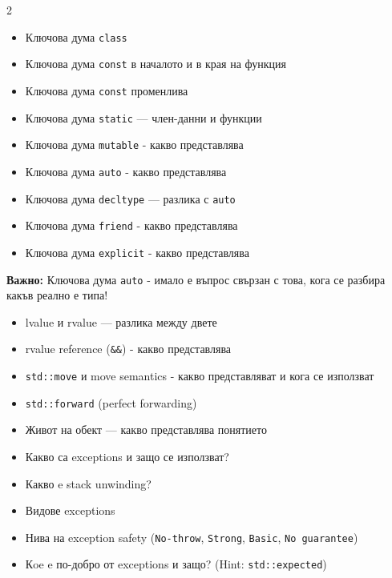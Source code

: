 \documentclass[a4paper,11pt]{article}
\newcommand{\nope}[1]{%
  \begin{tcolorbox}[warningbox]
    \faExclamationTriangle\quad\textbf{\color{warning}Важно:} #1
  \end{tcolorbox}%
}
\newcommand{\qtag}[1]{\texttt{\color{greenaccent}\small#1}}
\begin{document}
\begin{tcolorbox}[categorybox, title={ 7.\ Ключови думи}]
\begin{multicols}{2}
\begin{itemize}
\item Ключова дума \qtag{class}
  \item Ключова дума \qtag{const} в началото и в края на функция
  \item Ключова дума \qtag{const} променлива
  \item Ключова дума \qtag{static} — член-данни и функции
  \item Ключова дума \qtag{mutable} - какво представлява
  \item Ключова дума \qtag{auto} - какво представлява
  \item Ключова дума \qtag{decltype} — разлика с \qtag{auto}
  \item Ключова дума \qtag{friend} - какво представлява
  \item Ключова дума \qtag{explicit} - какво представлява
\end{itemize}
\end{multicols}
\nope{Ключова дума \qtag{auto} - имало е въпрос свързан с това, кога се разбира какъв реално е типа!}
\end{tcolorbox}

\begin{tcolorbox}[categorybox, title={8.\ Move семантика и стойности}]
\begin{itemize}
  \item lvalue и rvalue — разлика между двете
  \item rvalue reference (\qtag{\&\&}) - какво представлява
  \item \qtag{std::move} и move semantics - какво представляват и кога се използват
  \item \qtag{std::forward} (perfect forwarding)
  \item Живот на обект — какво представлява понятието
\end{itemize}
\end{tcolorbox}

\begin{tcolorbox}[categorybox, title={9.\ Изключения}]
\begin{itemize}
\item Какво са exceptions и защо се използват?
\item Какво e stack unwinding?
  \item Видове exceptions
  \item Нива на exception safety (\qtag{No-throw}, \qtag{Strong}, \qtag{Basic}, \qtag{No guarantee})
  \item Кoe e по-добро от exceptions и защо? (Hint: \qtag{std::expected})
\end{itemize}
\end{tcolorbox}
\end{document}
